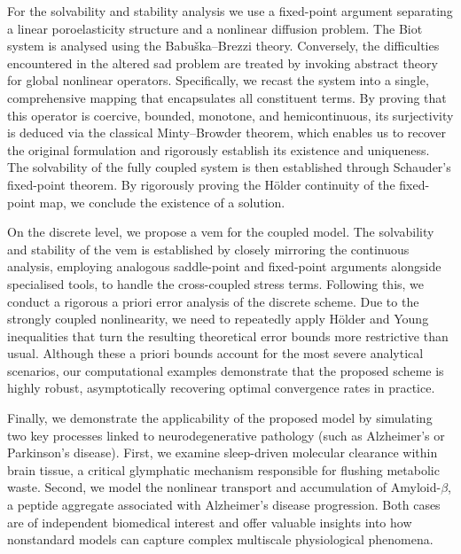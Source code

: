 \documentclass[fleqn,a4paper]{cas-sc}
\newcommand{\0}{\boldsymbol{0}}
\numberwithin{equation}{section}
\numberwithin{figure}{section}
\begin{document}
For the   solvability and stability analysis we use  a fixed-point argument separating a linear poroelasticity structure and a nonlinear diffusion problem. The   Biot system is analysed using  the Babu\v{s}ka--Brezzi theory. Conversely, the difficulties encountered in the altered \gls{sad} problem are treated by invoking abstract theory for global nonlinear operators. Specifically, we recast the system into a single, comprehensive mapping that encapsulates all constituent terms. By proving that this operator is coercive, bounded, monotone, and hemicontinuous, its surjectivity is deduced via the classical Minty--Browder theorem, which enables us to recover the original formulation and rigorously establish its existence and uniqueness. The solvability of the fully coupled  system is then established through Schauder's fixed-point theorem. By rigorously proving the Hölder continuity of the  fixed-point map, we conclude the existence of {a} solution.  

On the discrete level, we propose a \gls{vem}   for the coupled model. The solvability and stability of the \gls{vem} is established by closely mirroring the continuous analysis, employing analogous saddle-point and fixed-point arguments alongside specialised tools, to handle the cross-coupled stress terms. Following this, we conduct a rigorous a priori error analysis of the discrete scheme. Due to the strongly coupled nonlinearity, we need to repeatedly apply H\"older and Young inequalities that turn the resulting theoretical error bounds more restrictive than usual. Although these a priori bounds account for the most severe analytical scenarios, our computational examples demonstrate that the proposed scheme is highly robust, asymptotically recovering optimal convergence rates in practice.

Finally, we demonstrate the applicability of the proposed model by simulating two key processes linked to neurodegenerative pathology {(such} as Alzheimer's or Parkinson's disease). First, we examine sleep-driven molecular clearance within brain tissue, a critical glymphatic mechanism responsible for flushing metabolic waste. Second, we model the nonlinear transport and accumulation of Amyloid-$\beta$, a peptide aggregate associated with Alzheimer's disease progression. Both cases are of independent biomedical interest and offer valuable insights into how nonstandard models can capture complex multiscale physiological phenomena.

\end{document}
